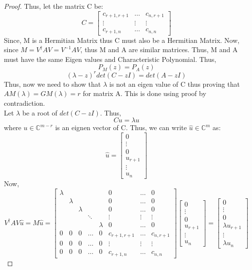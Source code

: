 \begin{proof}
    Thus, let the matrix C be:
    \[ C=\begin{bmatrix} c_{r+1,r+1} & \ldots & c_{n,r+1} \\ \vdots & \vdots & \vdots \\ c_{r+1,n} & \ldots & c_{n,n} \end{bmatrix}\]
    Since, M is a Hermitian Matrix thus C must also be a Hermitian Matrix. 
    Now, since $M=V^{\dagger}AV=V^{-1}AV$, thus M and A are similar matrices. Thus, M and A must have the same Eigen values and Characteristic Polynomial.
    Thus, 
    \[P_M(z)=P_A(z)\]
    \[(\lambda-z)^rdet(C-zI)=det(A-zI)\]
    Thus, now we need to show that $\lambda$ is not an eigen value of C thus proving that $AM(\lambda)=GM(\lambda)=r$ for matrix A.
    This is done using proof by contradiction.\\
    Let $\lambda$ be a root of $det(C-zI)$. Thus,
    \[Cu=\lambda u\]
    where $u \in \mathbb{C}^{m-r}$ is an eignen vector of C. Thus, we can write $\hat{u} \in \mathbb{C}^m$ as:
    \[\hat{u}=\begin{bmatrix} 0 \\ \vdots \\ 0 \\ u_{r+1} \\ \vdots \\ u_n \end{bmatrix}\]
    Now,
    \[V^{\dagger}AV \hat{u}=M\hat{u}=\begin{bmatrix} \lambda & & & & & 0 & \ldots & 0 \\ & \lambda & & & & 0 & \ldots & 0 \\ & & \lambda & & & 0 & \ldots & 0 \\ & & & \ddots & & \vdots & \vdots & \vdots \\ & & & & \lambda & 0 & \ldots & 0 \\ 0 & 0 & 0 & \ldots & 0 & c_{r+1,r+1} & \ldots & c_{n,r+1} \\ 0 & 0 & 0 & \ldots & 0 & \vdots & \vdots & \vdots \\ 0 & 0 & 0 & \ldots & 0 & c_{r+1,n} & \ldots & c_{n,n} \end{bmatrix}\begin{bmatrix} 0 \\ \vdots \\ 0 \\ u_{r+1} \\ \vdots \\ u_n \end{bmatrix}=\begin{bmatrix} 0 \\ \vdots \\ 0 \\ \lambda u_{r+1} \\ \vdots \\ \lambda u_n \end{bmatrix}\]

\end{proof}
